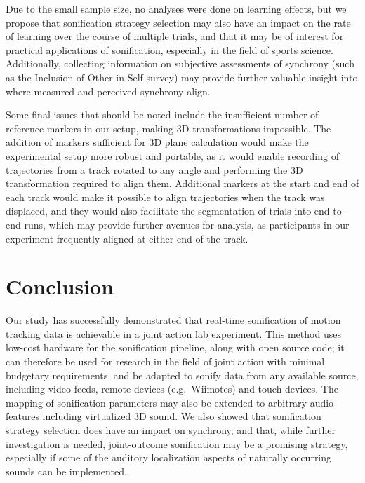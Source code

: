 \documentclass[10pt,a4paper,onecolumn]{article}
\begin{document}
Due to the small sample size, no analyses were done on learning effects, but we propose that sonification strategy selection may also have an impact on the rate of learning over the course of multiple trials, and that it may be of interest for practical applications of sonification, especially in the field of sports science. Additionally, collecting information on subjective assessments of synchrony (such as the Inclusion of Other in Self survey) may provide further valuable insight into where measured and perceived synchrony align.

Some final issues that should be noted include the insufficient number of reference markers in our setup, making 3D transformations impossible. The addition of markers sufficient for 3D plane calculation would make the experimental setup more robust and portable, as it would enable recording of trajectories from a track rotated to any angle and performing the 3D transformation required to align them. Additional markers at the start and end of each track would make it possible to align trajectories when the track was displaced, and they would also facilitate the segmentation of trials into end-to-end runs, which may provide further avenues for analysis, as participants in our experiment frequently aligned at either end of the track.

\hypertarget{conclusion}{%
\section{Conclusion}\label{conclusion}}

Our study has successfully demonstrated that real-time sonification of motion tracking data is achievable in a joint action lab experiment. This method uses low-cost hardware for the sonification pipeline, along with open source code; it can therefore be used for research in the field of joint action with minimal budgetary requirements, and be adapted to sonify data from any available source, including video feeds, remote devices (e.g.~Wiimotes) and touch devices. The mapping of sonification parameters may also be extended to arbitrary audio features including virtualized 3D sound. We also showed that sonification strategy selection does have an impact on synchrony, and that, while further investigation is needed, joint-outcome sonification may be a promising strategy, especially if some of the auditory localization aspects of naturally occurring sounds can be implemented.
\balance
\clearpage


\printbibliography[title=References,heading=bibintoc]
\end{document}
